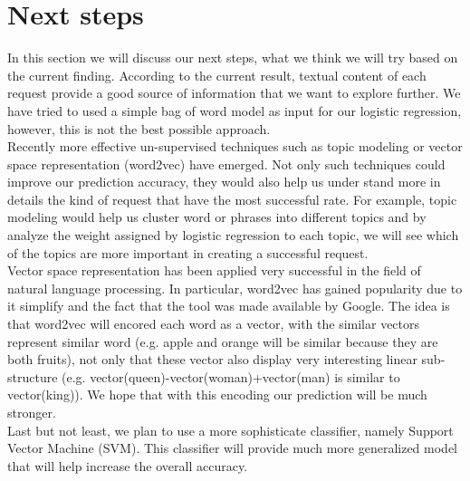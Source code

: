 \section{Next steps}

In this section we will discuss our next steps, what we think we will try based on the current finding. According to the current result, textual content of each request provide a good source of information that we want to explore further. We have tried to used a simple bag of word model as input for our logistic regression, however, this is not the best possible approach.\\

Recently more effective un-supervised techniques such as topic modeling or vector space representation (word2vec) have emerged. Not only such techniques could improve our prediction accuracy, they would also help us under stand more in details the kind of request that have the most successful rate. For example, topic modeling would help us cluster word or phrases into different topics and by analyze the weight assigned by logistic regression to each topic, we will see which of the topics are more important in creating a successful request.\\

Vector space representation has been applied very successful in the field of natural language processing. In particular, word2vec has gained popularity due to it simplify and the fact that the tool was made available by Google. The idea is that word2vec will encored each word as a  vector, with the similar vectors represent similar word (e.g. apple and orange will be similar because they are both fruits), not only that these vector also display very interesting linear sub-structure (e.g. vector(queen)-vector(woman)+vector(man) is similar to vector(king)). We hope that with this  encoding our prediction will be much stronger.\\

Last but not least, we plan to use a more sophisticate classifier, namely Support Vector Machine (SVM). This classifier will provide much more generalized model that will help increase the overall accuracy.